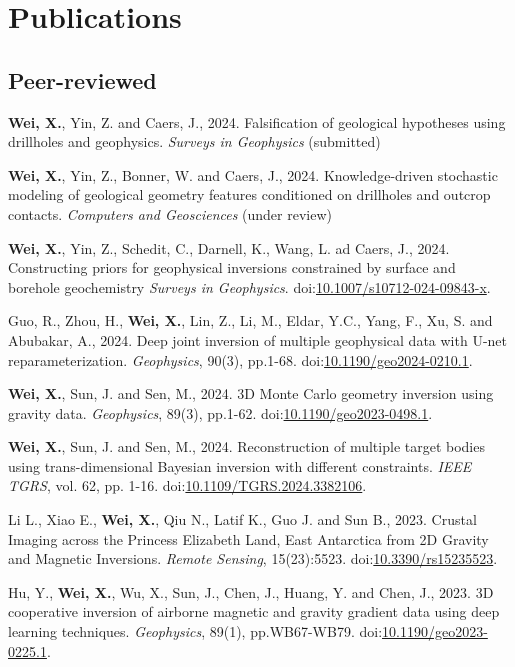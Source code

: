 \documentclass[11pt, a4paper]{article}
\newcommand{\LastName}{Wei}
\newcommand{\Initials}{X}
\newcommand{\Wei}{\textbf{\LastName, \Initials.}}  %
\newcommand{\Review}{under review}
\newcommand{\DOI}[1]{doi:\href{https://doi.org/#1}{#1}}
\begin{document}
\section*{Publications}
\subsection*{Peer-reviewed}
\begin{etaremune}	
	\item
	\Wei, Yin, Z. and Caers, J., 2024. Falsification of geological hypotheses using drillholes and geophysics. \emph{Surveys in Geophysics} (submitted)	
	
	\item
	\Wei, Yin, Z., Bonner, W. and Caers, J., 2024. Knowledge-driven stochastic modeling of geological geometry features conditioned on drillholes and outcrop contacts. \emph{Computers and Geosciences} (\Review)
	
	\item 
	\Wei, Yin, Z., Schedit, C., Darnell, K., Wang, L. ad Caers, J., 2024. Constructing priors for geophysical inversions constrained by surface and borehole geochemistry \emph{Surveys in Geophysics}. \DOI{10.1007/s10712-024-09843-x}.
	
	\item
	Guo, R., Zhou, H., \Wei, Lin, Z., Li, M., Eldar, Y.C., Yang, F., Xu, S. and Abubakar, A., 2024. Deep joint inversion of multiple geophysical data with U-net reparameterization. \emph{Geophysics}, 90(3), pp.1-68. \DOI{10.1190/geo2024-0210.1}. 
	
	\item
	\Wei, Sun, J. and Sen, M., 2024. 3D Monte Carlo geometry inversion using gravity data. \emph{Geophysics}, 89(3), pp.1-62. \DOI{10.1190/geo2023-0498.1}.
	
	\item
	\Wei, Sun, J. and Sen, M., 2024. Reconstruction of multiple target bodies using trans-dimensional Bayesian inversion with different constraints. \emph{IEEE TGRS}, vol. 62, pp. 1-16. \DOI{10.1109/TGRS.2024.3382106}. 
	
	\item
	Li L., Xiao E., \Wei, Qiu N., Latif K., Guo J. and Sun B., 2023. Crustal Imaging across the Princess Elizabeth Land, East Antarctica from 2D Gravity and Magnetic Inversions. \emph{Remote Sensing}, 15(23):5523. \DOI{10.3390/rs15235523}.
	
	\item
	Hu, Y., \Wei, Wu, X., Sun, J., Chen, J., Huang, Y. and Chen, J., 2023. 3D cooperative inversion of airborne magnetic and gravity gradient data using deep learning techniques. \emph{Geophysics}, 89(1), pp.WB67-WB79. \DOI{10.1190/geo2023-0225.1}.
	

\end{etaremune}
\end{document}
